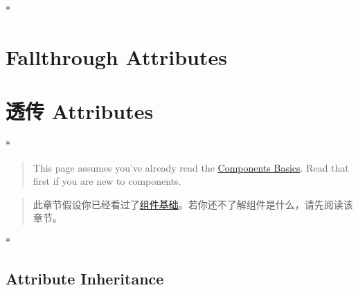 \begin{paracol}{2}
\switchcolumn[0]*%
\section{Fallthrough Attributes}
\switchcolumn
\section{透传 Attributes}
\switchcolumn[0]*%
\begin{quote}
This page assumes you've already read the
\href{https://vuejs.org/guide/essentials/component-basics.html}{Components
Basics}. Read that first if you are new to components.
\end{quote}
\switchcolumn
\begin{quote}
此章节假设你已经看过了\href{https://cn.vuejs.org/guide/essentials/component-basics.html}{组件基础}。若你还不了解组件是什么，请先阅读该章节。
\end{quote}
\switchcolumn[0]*%
\subsection{Attribute Inheritance}
\switchcolumn

\end{paracol}
